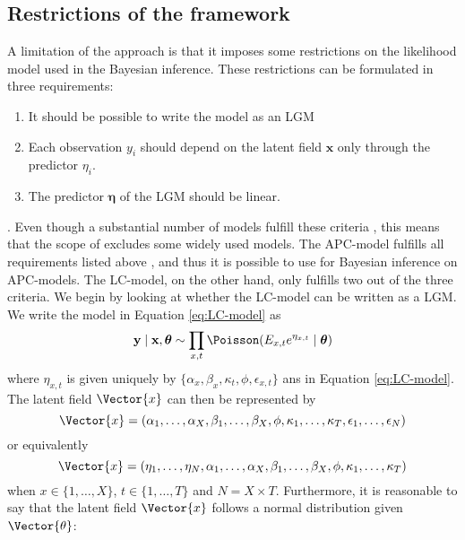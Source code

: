 \subsection{Restrictions of the \inla framework}
A limitation of the \inla approach is that it imposes some restrictions on the likelihood model used in the Bayesian inference. These restrictions can be formulated in three requirements:
\begin{enumerate}
    \item It should be possible to write the model as an LGM
    \item Each observation $y_i$ should depend on the latent field $\textbf{x}$ only through the predictor $\eta_i$. 
    \item The predictor $\boldsymbol{\eta}$ of the LGM should be linear.
    \label{item:inlaRequirements}
\end{enumerate}
\cite{martinoRiebler2019}.
Even though a substantial number of models fulfill these criteria \cite{rue2009inla}, this means that the scope of \inla excludes some widely used models. 
\newline
\noindent The APC-model fulfills all requirements listed above \cite{rieblerHeld2010}, and thus it is possible to use \inla for Bayesian inference on APC-models. The LC-model, on the other hand, only fulfills two out of the three criteria. We begin by looking at whether the LC-model can be written as a LGM. We write the model in Equation \ref{eq:LC-model} as 
\begin{equation}
    \textbf{y}\mid \textbf{x}, \boldsymbol{\theta} \sim \prod_{x,t}\Poisson(E_{x,t}e^{\eta_{x,t}}\mid \boldsymbol{\theta})
\end{equation}
where $\eta_{x,t}$ is given uniquely by $\{\alpha_x, \beta_x, \kappa_t, \phi, \epsilon_{x,t}\}$ ans in Equation \ref{eq:LC-model}. The latent field $\Vector{x}$ can then be represented by 
\begin{equation*}
    \Vector{x} = (\alpha_1,\ldots,\alpha_X,\beta_1,\ldots,\beta_X, \phi, \kappa_1,\ldots, \kappa_T, \epsilon_1, \ldots, \epsilon_N)
\end{equation*}
or equivalently 
\begin{equation}
    \Vector{x} = (\eta_1,\ldots,\eta_N,\alpha_1,\ldots,\alpha_X,\beta_1,\ldots,\beta_X, \phi, \kappa_1,\ldots, \kappa_T)
    \label{eq:LChyperparams}
\end{equation}
when $x\in \{1,\ldots,X\}$, $t\in\{1,\ldots,T\}$ and $N=X\times T$. Furthermore, it is reasonable to say that the latent field $\Vector{x}$ follows a normal distribution given $\Vector{\theta}$:
